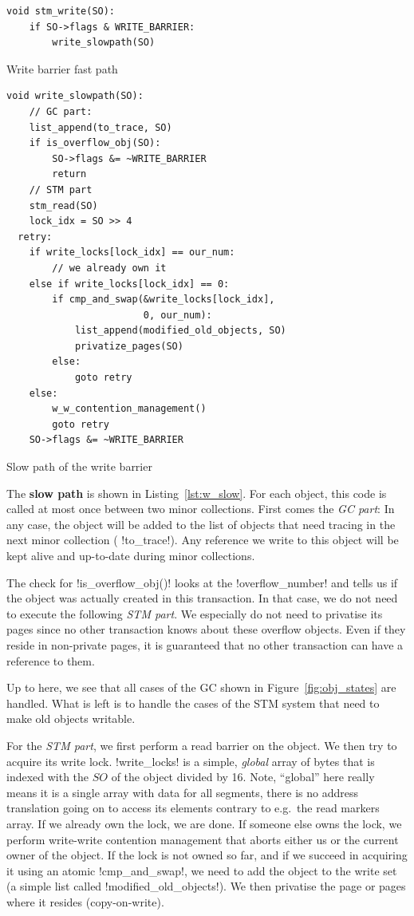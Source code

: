 \documentclass{sigplanconf}
\makeatletter
\renewcommand\lstinline[1][]{%
  \Collectverb{\@@myverb}%
}
\def\@@myverb#1{%
    \begingroup
    \fboxsep=0.2em
    \colorbox{verylightgray}{\oldlstinline|#1|}%
    \endgroup
}
\makeatother
\begin{document}
\begin{code}[h]
\begin{lstlisting}
void stm_write(SO):
	if SO->flags & WRITE_BARRIER:
		write_slowpath(SO)
\end{lstlisting}
\caption{Write barrier fast path\label{lst:w_fast}}
\end{code}

\begin{code}[h]
\begin{lstlisting}
void write_slowpath(SO):
	// GC part:
	list_append(to_trace, SO)
	if is_overflow_obj(SO):
		SO->flags &= ~WRITE_BARRIER
		return
	// STM part
	stm_read(SO)
	lock_idx = SO >> 4
  retry:
	if write_locks[lock_idx] == our_num:
		// we already own it
	else if write_locks[lock_idx] == 0:
		if cmp_and_swap(&write_locks[lock_idx],
					    0, our_num):
			list_append(modified_old_objects, SO)
			privatize_pages(SO)
		else:
			goto retry
	else:
		w_w_contention_management()
		goto retry
	SO->flags &= ~WRITE_BARRIER
\end{lstlisting}

\caption{Slow path of the write barrier\label{lst:w_slow}}
\end{code}


The \textbf{slow path} is shown in Listing~\ref{lst:w_slow}.  For
each object, this code is called at most once between two minor collections.
First comes the \emph{GC part}: In any case, the object will be added
to the list of objects that need tracing in the next minor collection
(\lstinline!to_trace!). Any reference we write to this object will
be kept alive and up-to-date during minor collections.

The check for \lstinline!is_overflow_obj()! looks at the
\lstinline!overflow_number!  and tells us if the object was actually
created in this transaction. In that case, we do not need to execute
the following \emph{STM part}.  We especially do not need to privatise
its pages since no other transaction knows about these overflow
objects. Even if they reside in non-private pages, it is guaranteed
that no other transaction can have a reference to them.

Up to here, we see that all cases of the GC shown in
Figure~\ref{fig:obj_states} are handled. What is left is to handle the
cases of the STM system that need to make old objects writable.

For the \emph{STM part}, we first perform a read barrier on the
object. We then try to acquire its write lock. \lstinline!write_locks!
is a simple, \emph{global} array of bytes that is indexed with the
$SO$ of the object divided by 16. Note, ``global'' here really means
it is a single array with data for all segments, there is no address
translation going on to access its elements contrary to e.g.\ the
read markers array.  If we already own the lock, we are done.
If someone else owns the lock, we perform  write-write contention
management that aborts either us or the current owner of the
object.  If the lock is not owned so far, and if we succeed in
acquiring it using an atomic
\lstinline!cmp_and_swap!, we need to add the object to the write set
(a simple list called \lstinline!modified_old_objects!).  We then
privatise the page or pages where it resides (copy-on-write).
\end{document}

